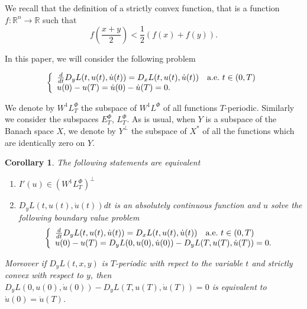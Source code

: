 \documentclass[twoside]{article}
\newtheorem{cor}[thm]{Corollary}
\newcommand{\lphi}{L^{\Phi}}
\newcommand{\ephi}{E^{\Phi}}
\newcommand{\wphi}{W^{1}\lphi}
\begin{document}
We recall that the definition of a strictly convex function, that is a function $f: \mathbb{R}^n \to \mathbb{R}$ such that
\[
f\left(\frac{x+y}{2}\right)< \frac{1}{2} \left(f\left( x\right)+f\left( y\right)\right).
\]


In this paper, we will consider the following problem


\begin{equation}\label{ecualagran}
    \left\{%
\begin{array}{ll}
   \frac{d}{dt} D_{y}L(t,u(t),\dot{u}(t))= D_{x}L(t,u(t),\dot{u}(t)) \quad \hbox{a.e.}\ t \in (0,T)\\
    u(0)-u(T)=\dot{u}(0)-\dot{u}(T)=0.
\end{array}%
\right.
\end{equation}

We denote by $\wphi_T$ the subspace of $\wphi$ of all functions $T$-periodic. Similarly we consider the subspaces $\ephi_T$, $\lphi_T$. As is usual, when $Y$ is a subspace of
the Banach space $X$, we denote by $Y^{\perp}$ the subspace of $X^*$ of all the functions which are identically zero on $Y$. 

\begin{cor} The following statements are equivalent
\begin{enumerate}
 \item $I'(u)\in\left( \wphi_T\right)^{\perp}$
 \item  $D_yL(t,u(t),\dot{u}(t))dt$ is an absolutely continuous function and $u$ solve the following boundary value problem
 \begin{equation}\label{ecualagran2}
    \left\{%
\begin{array}{ll}
   \frac{d}{dt} D_{y}L(t,u(t),\dot{u}(t))= D_{x}L(t,u(t),\dot{u}(t)) \quad \hbox{a.e.}\ t \in (0,T)\\
    u(0)-u(T)=D_yL(0,u(0),\dot{u}(0))-D_yL(T,u(T),\dot{u}(T))=0.
\end{array}%
\right.
\end{equation}

\end{enumerate}
Moreover if $D_yL(t,x,y)$ is $T$-periodic with repect to the variable $t$ and strictly convex with respect to $y$, then $D_yL(0,u(0),\dot{u}(0))-D_yL(T,u(T),\dot{u}(T))=0$ is 
equivalent to $\dot{u}(0)=\dot{u}(T)$. 
 
\end{cor}
\end{document}
